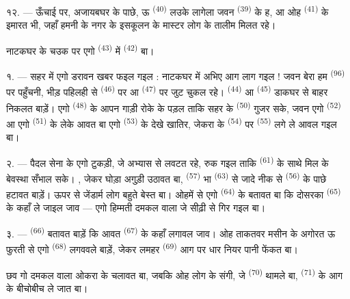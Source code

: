 १२. --- ऊँचाई पर, अजायबघर के पाछे, ऊ 
\textsuperscript{(40)} लउके लागेला जवन 
\textsuperscript{(39)} के ह, आ ओह
 \textsuperscript{(41)} के इमारत भी, जहाँ हमनी
के नगर के इसकूलन के मास्टर लोग के तालीम मिलत रहे।

नाटकघर के चउक पर एगो  \textsuperscript{(43)} में
 \textsuperscript{(42)} बा।

\VUsaut{5.0mm}
\VUsaut{3.0mm}

\VUsaut{3.4mm}

१. --- सहर में एगो डरावन खबर फइल गइल : नाटकघर में अभिए आग लाग गइल !
जवन बेरा हम  \textsuperscript{(96)} पर पहुँचनी, भीड़
पहिलही से  \textsuperscript{(46)} पर आ 
\textsuperscript{(47)} पर जुट चुकल रहे। 
\textsuperscript{(44)} आ  \textsuperscript{(45)}
डाकघर से बाहर निकलत बाड़ें। एगो 
\textsuperscript{(48)} के आपन गाड़ी रोके के पड़ल ताकि सहर के
 \textsuperscript{(50)} गुजर सके, जवन एगो 
\textsuperscript{(52)} आ एगो  \textsuperscript{(51)} के लेके
आवत बा एगो  \textsuperscript{(53)} के देखे खातिर, जेकरा के
 \textsuperscript{(54)} पर 
\textsuperscript{(55)} लगे ले आवल गइल बा।

२. --- पैदल सेना के एगो टुकड़ी, जे अभ्यास से लवटत रहे, रुक गइल ताकि
 \textsuperscript{(61)} के साथे मिल के
बेवस्था सँभाल सके। , जेकर घोड़ा अगुड़ी उठावत बा,
 \textsuperscript{(57)} भा 
\textsuperscript{(63)} से जादे नीक से  \textsuperscript{(56)}
के पाछे हटावत बाड़ें। ऊपर से जेंडार्म लोग बहुते बेस्त बा। ओहमें से एगो
 \textsuperscript{(64)} के बतावत बा कि दोसरका
 \textsuperscript{(65)} के कहाँ ले जाइल जाव —
एगो हिम्मती दमकल वाला जे सीढ़ी से गिर गइल बा।

३. ---  \textsuperscript{(66)} बतावत बाड़ें कि आवत
 \textsuperscript{(67)} के कहाँ लगावल जाव। ओह ताकतवर
मसीन के अगोरत ऊ फुरती से एगो  \textsuperscript{(68)}
लगववले बाड़ें, जेकर लमहर  \textsuperscript{(69)} आग पर धार
नियर पानी फेंकत बा।

छव गो दमकल वाला ओकरा के चलावत बा, जबकि ओह लोग के संगी, जे
 \textsuperscript{(70)} थामले बा, 
\textsuperscript{(71)} के आग के बीचोबीच ले जात बा।

